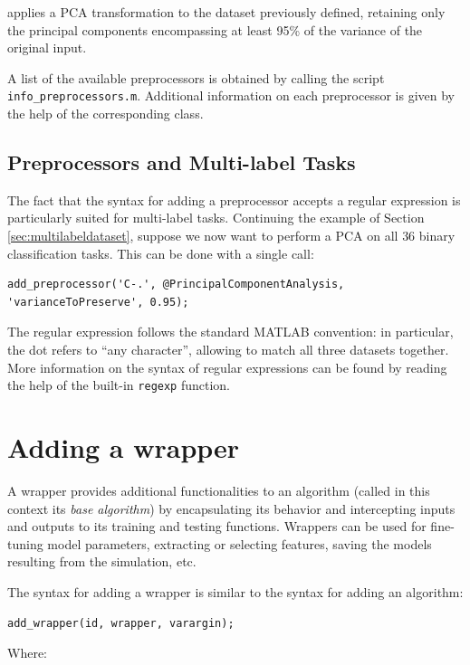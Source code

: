 \noindent applies a PCA transformation to the dataset previously defined, retaining only the principal components encompassing at least 95\% of the variance of the original input.

A list of the available preprocessors is obtained by calling the script \verb|info_preprocessors.m|. Additional information on each preprocessor is given by the help of the corresponding class.

\subsection{Preprocessors and Multi-label Tasks}

The fact that the syntax for adding a preprocessor accepts a regular expression is particularly suited for multi-label tasks. Continuing the example of Section \ref{sec:multilabeldataset}, suppose we now want to perform a PCA on all $36$ binary classification tasks. This can be done with a single call:

\begin{lstlisting}
add_preprocessor('C-.', @PrincipalComponentAnalysis, 'varianceToPreserve', 0.95);
\end{lstlisting}

\noindent The regular expression follows the standard MATLAB convention: in particular, the dot refers to ``any character'', allowing to match all three datasets together. More information on the syntax of regular expressions can be found by reading the help of the built-in \verb|regexp| function.

\section{Adding a wrapper}

A wrapper provides additional functionalities to an algorithm (called in this context its \textit{base algorithm}) by encapsulating its behavior and intercepting inputs and outputs to its training and testing functions. Wrappers can be used for fine-tuning model parameters, extracting or selecting features, saving the models resulting from the simulation, etc.

The syntax for adding a wrapper is similar to the syntax for adding an algorithm:

\begin{lstlisting}
add_wrapper(id, wrapper, varargin);
\end{lstlisting}

\noindent Where:

